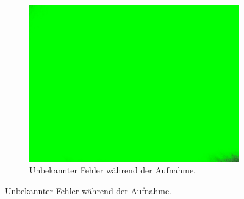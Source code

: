 \begin{figure}
  \centering
  \begin{subfigure}[t]{0.48\textwidth}
    \centering
    \includegraphics[width=\textwidth]{pictures/bad_3.pdf}
    \caption{Unbekannter Fehler während der Aufnahme.}%
    \label{subfig:fehler1}
  \end{subfigure}


\end{figure}

